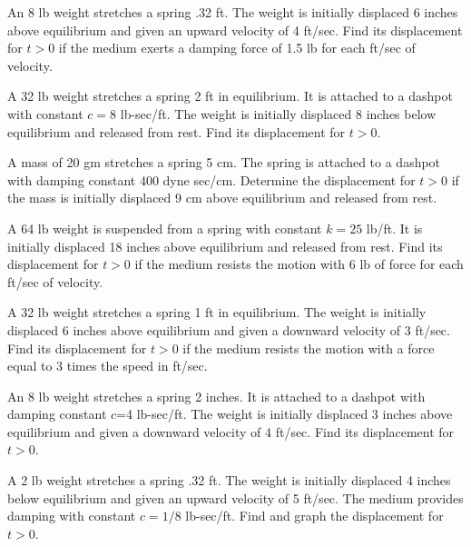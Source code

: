 \documentclass{ximera}
\begin{document}
\begin{problem}\label{exer:6.2.6}
An 8 lb weight stretches a spring .32 ft. The weight is initially
displaced 6 inches above equilibrium and given an upward velocity of 4
ft/sec. Find its displacement for $t>0$ if the medium exerts a
damping force of 1.5 lb for each ft/sec of velocity.
\end{problem}

\begin{problem}\label{exer:6.2.7}
A 32 lb weight stretches a spring 2 ft in equilibrium. It is attached
to a dashpot with constant $c=8$ lb-sec/ft. The weight is initially
displaced 8 inches below equilibrium and released from rest. Find its
displacement for $t>0$.
\end{problem}

\begin{problem}\label{exer:6.2.8}
  A mass of 20 gm stretches a  spring 5 cm.  The spring
is attached to a dashpot with damping constant 400 dyne sec/cm.  Determine
the displacement for $t>0$ if the mass is  initially displaced
 9 cm  above equilibrium  and released from rest.
\end{problem}

\begin{problem}\label{exer:6.2.9}
A 64 lb weight is suspended from a spring with constant $k=25$ lb/ft.
It is initially displaced 18 inches above equilibrium and released
from rest. Find its displacement for $t>0$ if the medium resists the
motion with 6 lb of force for each ft/sec of velocity.
\end{problem}

\begin{problem}\label{exer:6.2.10}
A 32 lb weight stretches a spring 1 ft in equilibrium. The weight is
initially displaced 6 inches above equilibrium and given a downward
velocity of 3 ft/sec. Find its displacement for $t>0$ if the medium
resists the motion with a force  equal to 3 times the speed
in ft/sec.
\end{problem}

\begin{problem}\label{exer:6.2.11}
An 8 lb weight stretches a spring 2 inches. It is attached to a
dashpot with damping constant $c$=4 lb-sec/ft. The weight is
initially displaced 3 inches above equilibrium and given a downward
velocity of 4 ft/sec. Find its displacement for $t>0$.
\end{problem}

\begin{problem}\label{exer:6.2.12}  
A 2 lb weight stretches a spring .32 ft. The weight is initially
displaced 4 inches below equilibrium and given an upward velocity of 5
ft/sec. The medium provides damping with constant $c=1/8$ lb-sec/ft.
Find and graph the displacement for $t>0$.
\end{problem}
\end{document}
